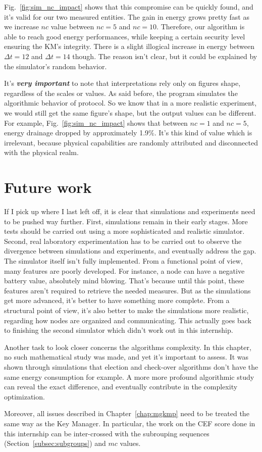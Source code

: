 Fig.~\ref{fig:sim_nc_impact} shows that this compromise can be quickly found, and it’s valid for our two measured entities. The gain in energy grows pretty fast as we increase $nc$ value between $nc=5$ and $nc=10$. Therefore, our algorithm is able to reach good energy performances, while keeping a certain security level ensuring the KM’s integrity. There is a slight illogical increase in energy between $\Delta t = 12$ and $\Delta t = 14$ though. The reason isn't clear, but it could be explained by the simulator's random behavior.

It's \textbf{\textit{very important}} to note that interpretations rely only on figures shape, regardless of the scales or values. As said before, the program simulates the algorithmic behavior of protocol. So we know that in a more realistic experiment, we would still get the same figure's shape, but the output values can be different. For example, Fig.~\ref{fig:sim_nc_impact} shows that between $nc=1$ and $nc=5$, energy drainage dropped by approximately 1.9\%. It's this kind of value which is irrelevant, because physical capabilities are randomly attributed and disconnected with the physical realm.

\section{Future work}

If I pick up where I last left off, it is clear that simulations and experiments need to be pushed way further. First, simulations remain in their early stages. More tests should be carried out using a more sophisticated and realistic simulator. Second, real laboratory experimentation has to be carried out to observe the divergence between simulations and experiments, and eventually address the gap. The simulator itself isn't fully implemented. From a functional point of view, many features are poorly developed. For instance, a node can have a negative battery value, absolutely mind blowing. That's because until this point, these features aren't required to retrieve the needed measures. But as the simulations get more advanced, it's better to have something more complete. From a structural point of view, it's also better to make the simulations more realistic, regarding how nodes are organized and communicating. This actually goes back to finishing the second simulator which didn't work out in this internship.

Another task to look closer concerns the algorithms complexity. In this chapter, no such mathematical study was made, and yet it's important to assess. It was shown through simulations that election and check-over algorithms don't have the same energy consumption for example. A more more profound algorithmic study can reveal the exact difference, and eventually contribute in the complexity optimization.

Moreover, all issues described in Chapter~\ref{chap:mgkmp} need to be treated the same way as the Key Manager. In particular, the work on the CEF score done in this internship can be inter-crossed with the subrouping sequences (Section~\ref{subsec:subgroups}) and $mc$ values.